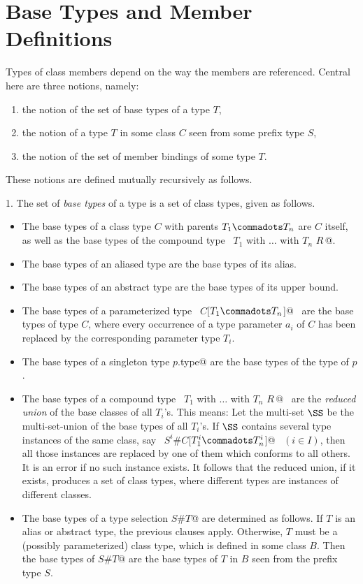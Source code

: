 \section{Base Types and Member Definitions}
\label{sec:base-classes-member-defs}

Types of class members depend on the way the members are referenced.
Central here are three notions, namely:
\begin{enumerate}
\item the notion of the set of base types of a type $T$,
\item the notion of a type $T$ in some class $C$ seen from some 
      prefix type $S$,
\item the notion of the set of member bindings of some type $T$.
\end{enumerate}
These notions are defined mutually recursively as follows.

1. The set of {\em base types} of a type is a set of class types, 
given as follows.
\begin{itemize}
\item
The base types of a class type $C$ with parents $T_1 \commadots T_n$ are
$C$ itself, as well as the base types of the compound type
~\lstinline@$T_1$ with $\ldots$ with $T_n$ {$R\,$}@.
\item
The base types of an aliased type are the base types of its alias.
\item
The base types of an abstract type are the base types of its upper bound.
\item
The base types of a parameterized type 
~\lstinline@$C$[$T_1 \commadots T_n$]@~ are the base types
of type $C$, where every occurrence of a type parameter $a_i$ 
of $C$ has been replaced by the corresponding parameter type $T_i$.
\item
The base types of a singleton type \lstinline@$p$.type@ are the base types of
the type of $p$.
\item
The base types of a compound type 
~\lstinline@$T_1$ with $\ldots$ with $T_n$ {$R\,$}@~ 
are the {\em reduced union} of the base
classes of all $T_i$'s. This means: 
Let the multi-set $\SS$ be the multi-set-union of the
base types of all $T_i$'s.
If $\SS$ contains several type instances of the same class, say
~\lstinline@$S^i$#$C$[$T^i_1 \commadots T^i_n$]@~ $(i \in I)$, then
all those instances 
are replaced by one of them which conforms to all
others. It is an error if no such instance exists. It follows that the reduced union, if it exists,
produces a set of class types, where different types are instances of different classes.
\item
The base types of a type selection \lstinline@$S$#$T$@ are
determined as follows. If $T$ is an alias or abstract type, the
previous clauses apply. Otherwise, $T$ must be a (possibly
parameterized) class type, which is defined in some class $B$.  Then
the base types of \lstinline@$S$#$T$@ are the base types of $T$
in $B$ seen from the prefix type $S$.
\end{itemize}

